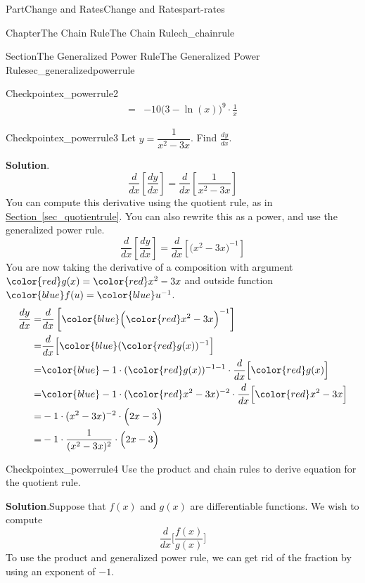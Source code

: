 \documentclass[oneside,10pt,]{tufte-book}
\newcommand{\blocktitlefont}{\relax}
\newcommand{\xreffont}{\relax}
\numberwithin{equation}{chapter}
\newcommand{\red}[1]{   {\color{red}   #1}   }
\newcommand{\blue}[1]{  {\color{blue}  #1}  }
\newcommand{\ddx}[1]{ \dfrac{d}{dx} \Big[ #1 \Big]  }
\newcommand{\ddxfrac}[1]{ \dfrac{d}{dx} \left[ #1 \right]  }
\newcommand{\amp}{&}
\begin{document}
\begin{partptx}{Part}{Change and Rates}{}{Change and Rates}{}{}{part-rates}
\begin{chapterptx}{Chapter}{The Chain Rule}{}{The Chain Rule}{}{}{ch_chainrule}
\begin{sectionptx}{Section}{The Generalized Power Rule}{}{The Generalized Power Rule}{}{}{sec_generalizedpowerrule}
\begin{inlineexercise}{Checkpoint}{}{ex_powerrule2}
\begin{align*}
= \amp -10 \Big(3-\ln(x)\Big)^9\cdot \frac{1}{x}
\end{align*}
%
\end{inlineexercise}%
\begin{inlineexercise}{Checkpoint}{}{ex_powerrule3}%
Let \(y = \dfrac{1}{x^2-3x}\).  Find \(\frac{dy}{dx}\).%
\par\smallskip%
\noindent\textbf{\blocktitlefont Solution}.\hypertarget{ex_powerrule3-2}{}\quad{}%
\begin{equation*}
\ddxfrac{\frac{dy}{dx}} = \ddxfrac{  \dfrac{1}{x^2-3x} }
\end{equation*}
You can compute this derivative using the quotient rule, as in \hyperref[sec_quotientrule]{Section~{\xreffont\ref{sec_quotientrule}}}. You can also rewrite this as a power, and use the generalized power rule.%
\begin{equation*}
\ddxfrac{\frac{dy}{dx}} = \ddxfrac{  \Big(x^2-3x\Big)^{-1} }
\end{equation*}
You are now taking the derivative of a composition with argument \(\red{g(x)} = \red{x^2-3x}\) and outside function \(\blue{f(u)} = \blue{u^{-1}} \).%
\begin{align*}
\frac{dy}{dx} = \amp \ddxfrac{ \blue{ \Big(\red{x^2-3x}\Big)^{-1} } } \\
= \amp \ddx{\blue{ ( \red{g(x)} )^{-1} } } \\
= \amp \blue{ -1\cdot ( \red{g(x)} )^{-1-1} }\cdot \ddx{ \red{g(x)} }\\
= \amp \blue{ -1\cdot ( \red{x^2-3x} )^{-2} }\cdot \ddx{ \red{x^2-3x} }\\
= \amp  -1\cdot ( x^2-3x )^{-2} \cdot \Big(2x-3\Big) \\
= \amp  -1\cdot \dfrac{1}{( x^2-3x )^{2}} \cdot \Big(2x-3\Big) 
\end{align*}
%
\end{inlineexercise}%
\begin{inlineexercise}{Checkpoint}{}{ex_powerrule4}%
Use the product and chain rules to derive equation for the quotient rule.%
\par\smallskip%
\noindent\textbf{\blocktitlefont Solution}.\hypertarget{ex_powerrule4-2}{}\quad{}Suppose that  \(f(x)\) and \(g(x)\) are differentiable functions.  We wish to compute%
\begin{equation*}
\ddx{ \dfrac{f(x)}{g(x)} } 
\end{equation*}
To use the product and generalized power rule, we can get rid of the fraction by using an exponent of \(-1\).%
\begin{equation*}

\end{equation*}
\end{inlineexercise}
\end{sectionptx}
\end{chapterptx}
\end{partptx}
\end{document}

